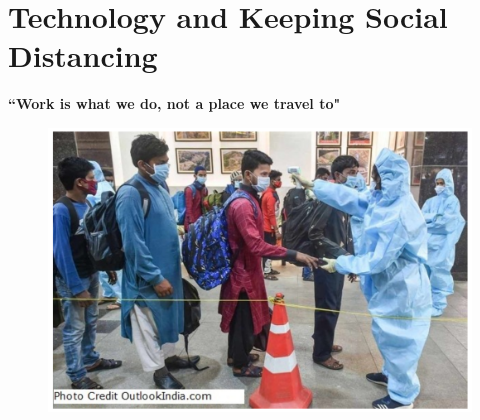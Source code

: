 \chapter{Technology and Keeping Social Distancing}


\newpage

\begin{center}
\textbf{``Work is what we do, not a place we travel to"}
\end{center}
\begin{figure}[H]
\vspace{-.3cm}
\centering
\includegraphics[scale=1.1]{src/Figures/chap3/fig001.jpg}

\end{figure}

